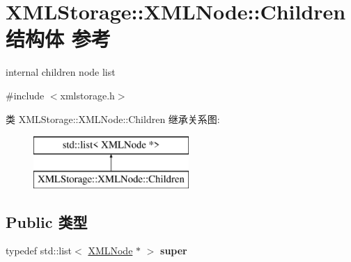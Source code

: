 \hypertarget{struct_x_m_l_storage_1_1_x_m_l_node_1_1_children}{}\section{X\+M\+L\+Storage\+:\+:X\+M\+L\+Node\+:\+:Children结构体 参考}
\label{struct_x_m_l_storage_1_1_x_m_l_node_1_1_children}


internal children node list  




{\ttfamily \#include $<$xmlstorage.\+h$>$}

类 X\+M\+L\+Storage\+:\+:X\+M\+L\+Node\+:\+:Children 继承关系图\+:\begin{figure}[H]
\begin{center}
\leavevmode
\includegraphics[height=2.000000cm]{struct_x_m_l_storage_1_1_x_m_l_node_1_1_children}
\end{center}
\end{figure}
\subsection*{Public 类型}
\begin{DoxyCompactItemize}
\item 
\mbox{\label{struct_x_m_l_storage_1_1_x_m_l_node_1_1_children_a4f3ec945f7589ea1ed5934d142a2cbdf}} 
typedef std\+::list$<$ \hyperlink{struct_x_m_l_storage_1_1_x_m_l_node}{X\+M\+L\+Node} $\ast$ $>$ {\bfseries super}
\end{DoxyCompactItemize}
